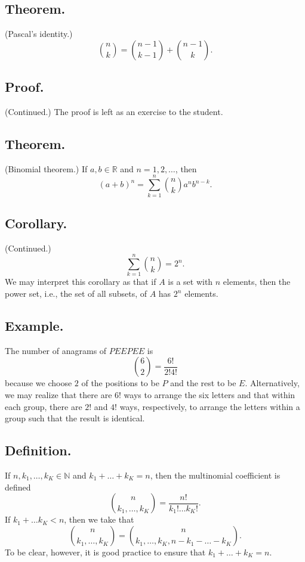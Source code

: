 \documentclass[titlepage]{article}
\begin{document}
\subsection{Theorem.} (Pascal's identity.) 
$$\binom{n}{k} = \binom{n-1}{k-1} + \binom{n-1}{k}.$$

\subsection{Proof.} (Continued.) The proof is left as an exercise to the student.

\subsection{Theorem.} (Binomial theorem.) If $a, b \in \mathbb{R}$ and $n = 1, 2, \ldots$, then 
$$(a + b)^{n} = \sum_{k=1}^{n}\binom{n}{k}a^{n}b^{n-k}.$$

\subsection{Corollary.} (Continued.)
$$\sum_{k=1}^{n}\binom{n}{k} = 2^{n}.$$
We may interpret this corollary as that if $A$ is a set with $n$ elements, then the power set, i.e., the set of all subsets, of $A$ has $2^{n}$ elements.

\subsection{Example.} The number of anagrams of $PEEPEE$ is 
$$\binom{6}{2} = \frac{6!}{2!4!}$$
because we choose $2$ of the positions to be $P$ and the rest to be $E$. Alternatively, we may realize that there are $6!$ ways to arrange the six letters and that within each group, there are $2!$ and $4!$ ways, respectively, to arrange the letters within a group such that the result is identical.

\subsection{Definition.} If $n, k_{1}, \ldots, k_{K} \in \mathbb{N}$ and $k_{1} + \ldots + k_{K} = n$, then the multinomial coefficient is defined 
$$\binom{n}{k_{1},\ldots,k_{K}} = \frac{n!}{k_{1}!\ldots k_{K}!}.$$
If $k_{1} + \ldots k_{K} < n$, then we take that 
$$\binom{n}{k_{1},\ldots,k_{K}} = \binom{n}{k_{1},\ldots,k_{K},n-k_{1}-\ldots-k_{K}}.$$
To be clear, however, it is good practice to ensure that $k_{1} + \ldots + k_{K} = n$.
\end{document}
